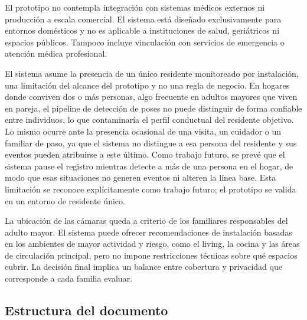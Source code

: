 El prototipo no contempla integración con sistemas médicos externos ni producción a escala comercial.
El sistema está diseñado exclusivamente para entornos domésticos y no es aplicable a instituciones de salud, geriátricos ni espacios públicos.
Tampoco incluye vinculación con servicios de emergencia o atención médica profesional.

El sistema asume la presencia de un único residente monitoreado por instalación, una limitación del alcance del prototipo y no una regla de negocio.
En hogares donde conviven dos o más personas, algo frecuente en adultos mayores que viven en pareja, el pipeline de detección de poses no puede distinguir de forma confiable entre individuos, lo que contaminaría el perfil conductual del residente objetivo.
Lo mismo ocurre ante la presencia ocasional de una visita, un cuidador o un familiar de paso, ya que el sistema no distingue a esa persona del residente y sus eventos pueden atribuirse a este último.
Como trabajo futuro, se prevé que el sistema pause el registro mientras detecte a más de una persona en el hogar, de modo que esas situaciones no generen eventos ni alteren la línea base.
Esta limitación se reconoce explícitamente como trabajo futuro; el prototipo se valida en un entorno de residente único.

La ubicación de las cámaras queda a criterio de los familiares responsables del adulto mayor.
El sistema puede ofrecer recomendaciones de instalación basadas en los ambientes de mayor actividad y riesgo, como el living, la cocina y las áreas de circulación principal, pero no impone restricciones técnicas sobre qué espacios cubrir.
La decisión final implica un balance entre cobertura y privacidad que corresponde a cada familia evaluar.

\subsection{Estructura del documento}


